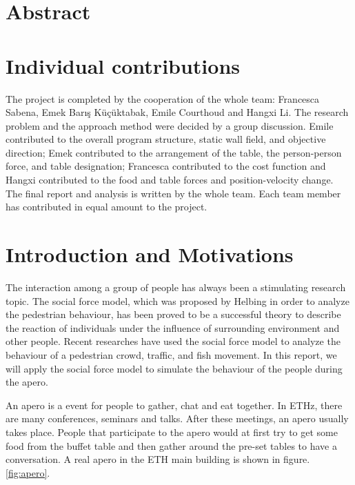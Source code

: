 \documentclass[11pt]{article}
\begin{document}



\section{Abstract}

\section{Individual contributions}

The project is completed by the cooperation of the whole team: Francesca Sabena, Emek Barış Küçüktabak, Emile Courthoud and Hangxi Li. The research problem and the approach method were decided by a group discussion. Emile contributed to the overall program structure, static wall field, and objective direction; Emek contributed to the arrangement of the table, the person-person force, and table designation; Francesca contributed to the cost function and Hangxi contributed to the food and table forces and position-velocity change. The final report and analysis is written by the whole team. Each team member has contributed in equal amount to the project.

\section{Introduction and Motivations}
The interaction among a group of people has always been a stimulating research topic. The social force model, which was proposed by Helbing\cite{Socialforce,ModificationSocialforce} in order to analyze the pedestrian behaviour, has been proved to be a successful theory to describe the reaction of individuals under the influence of surrounding environment and other people. Recent researches have used the social force model to analyze the behaviour of a pedestrian crowd\cite{crowd1,crowd2,crowd3,traffic3crowd4}, traffic\cite{traffic1,traffic2,traffic3crowd4}, and fish movement\cite{fish}. In this report, we will apply the social force model to simulate the behaviour of the people during the apero. 

An apero is a event for people to gather, chat and eat together. In ETHz, there are many conferences, seminars and talks. After these meetings, an apero usually takes place. People that participate to the apero would at first try to get some food from the buffet table and then gather around the pre-set tables to have a conversation. A real apero in the ETH main building is shown in figure.\ref{fig:apero}.
\end{document}
